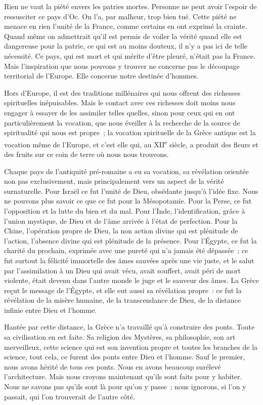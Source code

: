 \documentclass[french,twoside]{book} %
\begin{document}
Rien ne vaut la piété envers les patries mortes. Personne ne peut avoir l'espoir de ressusciter ce pays d'Oc. On l'a, par malheur, trop bien tué. Cette piété ne menace en rien l'unité de la France, comme certains en ont exprimé la crainte. Quand même on admettrait qu'il est permis de voiler la vérité quand elle est dangereuse pour la patrie, ce qui est au moins douteux, il n'y a pas ici de telle nécessité. Ce pays, qui est mort et qui mérite d'être pleuré, n'était pas la France. Mais l'inspiration que nous pouvons y trouver ne concerne pas le découpage territorial de l'Europe. Elle concerne notre destinée d'hommes.\par
Hors d'Europe, il est des traditions millénaires qui nous offrent des riches­ses spirituelles inépuisables. Mais le contact avec ces richesses doit moins nous engager à essayer de les assimiler telles quelles, sinon pour ceux qui en ont particulièrement la vocation, que nous éveiller à la recherche de la source de spiritualité qui nous est propre ; la vocation spirituelle de la Grèce antique est la vocation même de l'Europe, et c'est elle qui, au XII\textsuperscript{e} siècle, a produit des fleurs et des fruits sur ce coin de terre où nous nous trouvons.\par
Chaque pays de l'antiquité pré-romaine a eu sa vocation, sa révélation orientée non pas exclusivement, mais principalement vers un aspect de la vérité surnaturelle. Pour Israël ce fut l'unité de Dieu, obsédante jusqu'à l'idée fixe. Nous ne pouvons plus savoir ce que ce fut pour la Mésopotamie. Pour la Perse, ce fut l'opposition et la lutte du bien et du mal. Pour l'Inde, l'identifi­cation, grâce à l'union mystique, de Dieu et de l'âme arrivée à l'état de perfection. Pour la Chine, l'opération propre de Dieu, la non action divine qui est plénitude de l'action, l'absence divine qui est plénitude de la présence. Pour l'Égypte, ce fut la charité du prochain, exprimée avec une pureté qui n'a jamais été dépassée ; ce fut surtout la félicité immortelle des âmes sauvées après une vie juste, et le salut par l'assimilation à un Dieu qui avait vécu, avait souffert, avait péri de mort violente, était devenu dans l'autre monde le juge et le sauveur des âmes. La Grèce reçut le message de l'Égypte, et elle eut aussi sa révélation propre : ce fut la révélation de la misère humaine, de la transcen­dance de Dieu, de la distance infinie entre Dieu et l'homme.\par
Hantée par cette distance, la Grèce n'a travaillé qu'à construire des ponts. Toute sa civilisation en est faite. Sa religion des Mystères, sa philosophie, son art merveilleux, cette science qui est son invention propre et toutes les bran­ches de la science, tout cela, ce furent des ponts entre Dieu et l'homme. Sauf le premier, nous avons hérité de tous ces ponts. Nous en avons beaucoup surélevé l'architecture. Mais nous croyons maintenant qu'ils sont faits pour y habiter. Nous ne savons pas qu'ils sont là pour qu'on y passe ; nous ignorons, si l'on y passait, qui l'on trouverait de l'autre côté.\par
\end{document}
